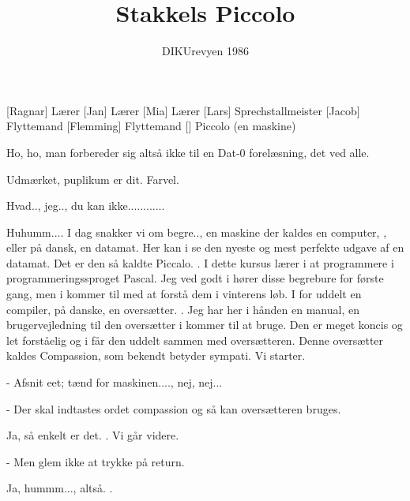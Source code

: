 \documentclass[a4paper,11pt]{article}
\title{Stakkels Piccolo}
\author{DIKUrevyen 1986}
\begin{document}
\maketitle

\begin{roles}
[Ragnar] Lærer
[Jan] Lærer
[Mia] Lærer
[Lars] Sprechstallmeister
[Jacob] Flyttemand
[Flemming] Flyttemand
[] Piccolo (en maskine)
\end{roles}

\begin{sketch}


 Ho, ho, man forbereder sig altså ikke til en Dat-0 forelæsning, det
ved alle.

 Udmærket, puplikum er dit. Farvel.


 Hvad.., jeg.., du kan ikke............


 Huhumm.... I dag snakker vi om begre.., en maskine der kaldes en
computer, , eller på dansk, en datamat. Her kan i se den
nyeste og mest perfekte udgave af en datamat. Det er den så kaldte
Piccalo. . I dette kursus lærer i at programmere i
programmeringssproget Pascal. Jeg ved godt i hører disse begrebure for første
gang, men i kommer til med at forstå dem i vinterens løb. I for uddelt en
compiler, på danske, en oversætter. . Jeg har her i hånden en manual, en brugervejledning til den
oversætter i kommer til at bruge. Den er meget koncis og let forståelig og i får
den uddelt sammen med oversætteren. Denne oversætter kaldes Compassion, som
bekendt betyder sympati. Vi starter.

- Afsnit eet; tænd for maskinen...., nej, nej... 

- Der skal indtastes ordet compassion og så kan oversætteren bruges.

Ja, så enkelt er det. . Vi går videre.

- Men glem ikke at trykke på return.

Ja, hummm..., altså. .


\end{sketch}
\end{document}
